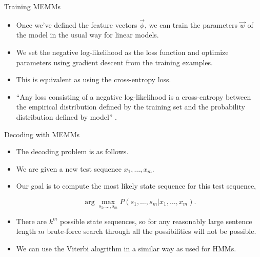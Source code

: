 \documentclass[handout]{beamer}
\begin{document}
\begin{frame}{Training MEMMs}
\begin{scriptsize}
\begin{itemize}

\item Once we've defined the feature vectors $\vec{\phi}$, we can train the parameters $\vec{w}$ of the model in the usual way for linear models.

\item We set the negative log-likelihood as the loss function and optimize parameters using gradient descent from the training examples.

\item This is equivalent as using the cross-entropy loss.

\item ``Any loss consisting of a negative log-likelihood is a cross-entropy between the empirical distribution defined by the training set and the probability distribution defined by model'' \cite{goodfellow2016deep}.  
 
\end{itemize}


\end{scriptsize}
\end{frame}




\begin{frame}{Decoding with MEMMs}
\begin{scriptsize}
\begin{itemize}

\item The decoding problem is as follows.
\item We are given a new test sequence $x_1, \dots, x_m$.
\item Our goal is to compute the most likely state sequence for this test sequence,

\begin{equation}
 \operatorname{arg} \max_{s_1,\dots,s_m} P(s_1,\dots,s_m|x_1,\dots,x_m).
\end{equation}

\item There are $k^m$ possible state sequences, so for any reasonably large sentence length $m$ brute-force search through all the possibilities will not be possible.

\item We can use the Viterbi alogrithm in a similar way as used for HMMs.
 
\end{itemize}


\end{scriptsize}
\end{frame}
\end{document}
